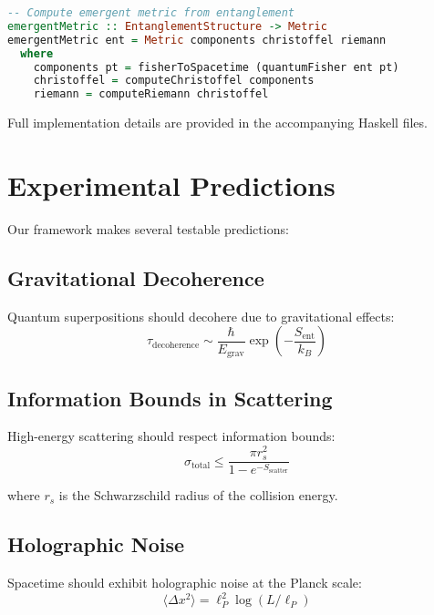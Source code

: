 \documentclass[12pt]{article}
\begin{document}
\begin{lstlisting}[language=Haskell]
-- Compute emergent metric from entanglement
emergentMetric :: EntanglementStructure -> Metric
emergentMetric ent = Metric components christoffel riemann
  where
    components pt = fisherToSpacetime (quantumFisher ent pt)
    christoffel = computeChristoffel components
    riemann = computeRiemann christoffel
\end{lstlisting}

Full implementation details are provided in the accompanying Haskell files.

\section{Experimental Predictions}

Our framework makes several testable predictions:

\subsection{Gravitational Decoherence}

Quantum superpositions should decohere due to gravitational effects:
\begin{equation}
\tau_{\text{decoherence}} \sim \frac{\hbar}{E_{\text{grav}}} \exp\left(-\frac{S_{\text{ent}}}{k_B}\right)
\end{equation}

\subsection{Information Bounds in Scattering}

High-energy scattering should respect information bounds:
\begin{equation}
\sigma_{\text{total}} \leq \frac{\pi r_s^2}{1 - e^{-S_{\text{scatter}}}}
\end{equation}

where $r_s$ is the Schwarzschild radius of the collision energy.

\subsection{Holographic Noise}

Spacetime should exhibit holographic noise at the Planck scale:
\begin{equation}
\langle \Delta x^2 \rangle = \ell_P^2 \log(L/\ell_P)
\end{equation}
\end{document}
